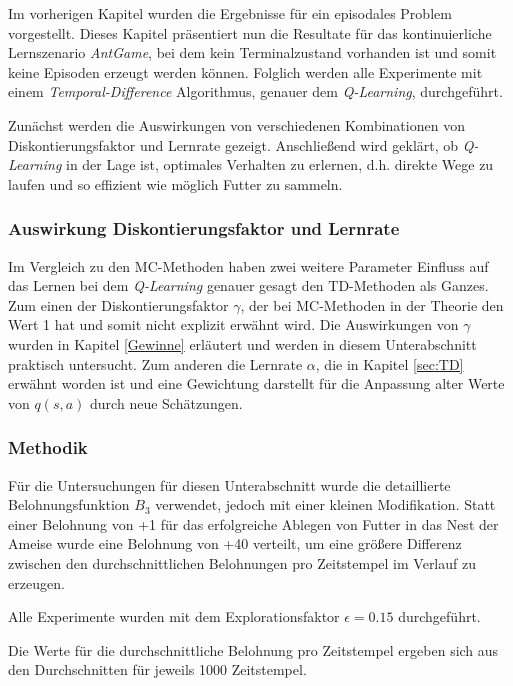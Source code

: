 Im vorherigen Kapitel wurden die Ergebnisse für ein episodales Problem vorgestellt. Dieses Kapitel präsentiert nun die Resultate für das kontinuierliche Lernszenario \textit{AntGame}, bei dem kein Terminalzustand vorhanden ist und somit keine Episoden erzeugt werden können. Folglich werden alle Experimente mit einem \textit{Temporal-Difference} Algorithmus, genauer dem \textit{Q-Learning}, durchgeführt. 
\par 
Zunächst werden die Auswirkungen von verschiedenen Kombinationen von Diskontierungsfaktor und Lernrate gezeigt. Anschließend wird geklärt, ob \textit{Q-Learning} in der Lage ist, optimales Verhalten zu erlernen, d.h. direkte Wege zu laufen und so effizient wie möglich Futter zu sammeln.


\subsubsection{Auswirkung Diskontierungsfaktor und Lernrate}
Im Vergleich zu den MC-Methoden haben zwei weitere Parameter Einfluss auf das Lernen bei dem \textit{Q-Learning} genauer gesagt den TD-Methoden als Ganzes. Zum einen der Diskontierungsfaktor $\gamma$, der bei MC-Methoden in der Theorie den Wert 1 hat und somit nicht explizit erwähnt wird. Die Auswirkungen von $\gamma$ wurden in Kapitel \ref{Gewinne} erläutert und werden in diesem Unterabschnitt praktisch untersucht. Zum anderen die Lernrate $\alpha$, die in Kapitel \ref{sec:TD} erwähnt worden ist und eine Gewichtung darstellt für die Anpassung alter Werte von $q(s,a)$ durch neue Schätzungen.

\subsubsection*{Methodik}
Für die Untersuchungen für diesen Unterabschnitt wurde die detaillierte Belohnungsfunktion $B_3$ verwendet, jedoch mit einer kleinen Modifikation. Statt einer Belohnung von +1 für das erfolgreiche Ablegen von Futter in das Nest der Ameise wurde eine Belohnung von +40 verteilt, um eine größere Differenz zwischen den durchschnittlichen Belohnungen pro Zeitstempel im Verlauf zu erzeugen.
\par 
Alle Experimente wurden mit dem Explorationsfaktor $\epsilon = 0.15$ durchgeführt.
\par 
Die Werte für die durchschnittliche Belohnung pro Zeitstempel ergeben sich aus den Durchschnitten für jeweils 1000 Zeitstempel.

